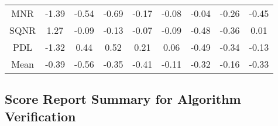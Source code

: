 \begin{longtable}{ | c || c | c | c | c | c | c | c || c |}
MNR &  \cellcolor[HTML]{FFDFDF} -1.39 &  \cellcolor[HTML]{FFEFEF} -0.54 &  \cellcolor[HTML]{FFEFEF} -0.69 &  \cellcolor[HTML]{FFF7F7} -0.17 &  \cellcolor[HTML]{FFFFFF} -0.08 &  \cellcolor[HTML]{FFFFFF} -0.04 &  \cellcolor[HTML]{FFF7F7} -0.26 &  \cellcolor[HTML]{FFF7F7} -0.45 \\
SQNR &  \cellcolor[HTML]{DFDFFF} 1.27 &  \cellcolor[HTML]{FFFFFF} -0.09 &  \cellcolor[HTML]{FFFFFF} -0.13 &  \cellcolor[HTML]{FFFFFF} -0.07 &  \cellcolor[HTML]{FFFFFF} -0.09 &  \cellcolor[HTML]{FFEFEF} -0.48 &  \cellcolor[HTML]{FFF7F7} -0.36 &  \cellcolor[HTML]{FFFFFF} 0.01 \\
PDL &  \cellcolor[HTML]{FFDFDF} -1.32 &  \cellcolor[HTML]{F7F7FF} 0.44 &  \cellcolor[HTML]{EFEFFF} 0.52 &  \cellcolor[HTML]{F7F7FF} 0.21 &  \cellcolor[HTML]{FFFFFF} 0.06 &  \cellcolor[HTML]{FFEFEF} -0.49 &  \cellcolor[HTML]{FFF7F7} -0.34 &  \cellcolor[HTML]{FFFFFF} -0.13 \\
\hline
\hline
Mean  &  \cellcolor[HTML]{FFF7F7} -0.39 &  \cellcolor[HTML]{FFEFEF} -0.56 &  \cellcolor[HTML]{FFF7F7} -0.35 &  \cellcolor[HTML]{FFF7F7} -0.41 &  \cellcolor[HTML]{FFFFFF} -0.11 &  \cellcolor[HTML]{FFF7F7} -0.32 &  \cellcolor[HTML]{FFF7F7} -0.16 &  \cellcolor[HTML]{FFF7F7} -0.33 \\
\hline
\end{longtable}

\subsection*{Score Report Summary for Algorithm Verification}


